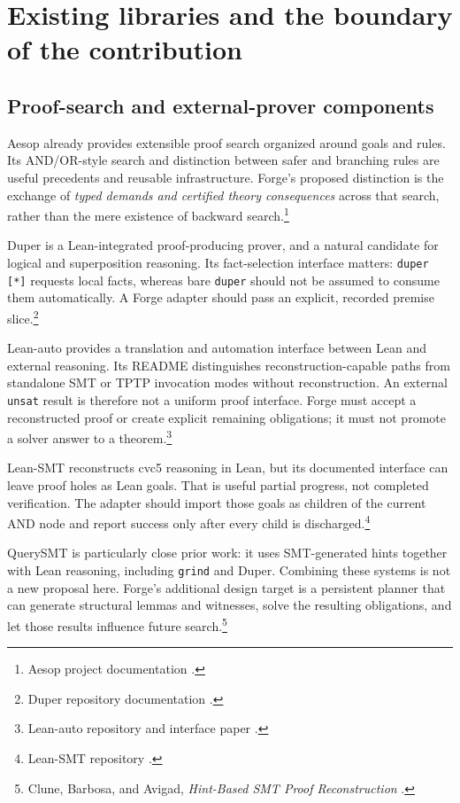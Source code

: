 \documentclass[11pt,a4paper]{article}
\newcommand{\code}[1]{\texttt{#1}}
\begin{document}
\section{Existing libraries and the boundary of the contribution}
\label{sec:libraries}

\subsection{Proof-search and external-prover components}
Aesop already provides extensible proof search organized around goals and rules.
Its AND/OR-style search and distinction between safer and branching rules are
useful precedents and reusable infrastructure. Forge's proposed distinction is
the exchange of \emph{typed demands and certified theory consequences} across
that search, rather than the mere existence of backward search.\footnote{Aesop
project documentation \cite{aesop}.}

Duper is a Lean-integrated proof-producing prover, and a natural candidate for
logical and superposition reasoning. Its fact-selection interface matters:
\code{duper [*]} requests local facts, whereas bare \code{duper} should not be
assumed to consume them automatically. A Forge adapter should pass an explicit,
recorded premise slice.\footnote{Duper repository documentation \cite{duper}.}

Lean-auto provides a translation and automation interface between Lean and
external reasoning. Its README distinguishes reconstruction-capable paths from
standalone SMT or TPTP invocation modes without reconstruction. An external
\code{unsat} result is therefore not a uniform proof interface. Forge must
accept a reconstructed proof or create explicit remaining obligations; it must
not promote a solver answer to a theorem.\footnote{Lean-auto repository and
interface paper \cite{auto,autopaper}.}

Lean-SMT reconstructs cvc5 reasoning in Lean, but its documented interface can
leave proof holes as Lean goals. That is useful partial progress, not completed
verification. The adapter should import those goals as children of the current
AND node and report success only after every child is discharged.\footnote{Lean-SMT
repository \cite{smt}.}

QuerySMT is particularly close prior work: it uses SMT-generated hints together
with Lean reasoning, including \code{grind} and Duper. Combining these systems
is not a new proposal here. Forge's additional design target is a persistent
planner that can generate structural lemmas and witnesses, solve the resulting
obligations, and let those results influence future search.\footnote{Clune,
Barbosa, and Avigad, \emph{Hint-Based SMT Proof Reconstruction} \cite{querysmt}.}
\end{document}
